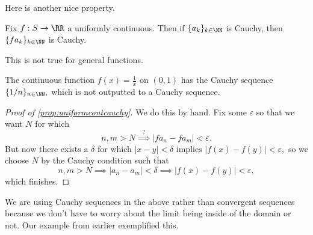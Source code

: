 \documentclass[../notes.tex]{subfiles}
\begin{document}
Here is another nice property.
\begin{proposition} \label{prop:uniformcontcauchy}
	Fix $f:S\to\RR$ a uniformly continuous. Then if $\{a_k\}_{k\in\NN}$ is Cauchy, then $\{fa_k\}_{k\in\NN}$ is Cauchy.
\end{proposition}
This is not true for general functions.
\begin{example}
	The continuous function $f(x)=\frac1x$ on $(0,1)$ has the Cauchy sequence $\{1/n\}_{n\in\NN},$ which is not outputted to a Cauchy sequence.
\end{example}
\begin{proof}[Proof of \autoref{prop:uniformcontcauchy}]
	We do this by hand. Fix some $\varepsilon$ so that we want $N$ for which
	\[n,m>N\stackrel?\implies|fa_n-fa_m|<\varepsilon.\]
	But now there exists a $\delta$ for which $|x-y|<\delta$ implies $|f(x)-f(y)|<\varepsilon,$ so we choose $N$ by the Cauchy condition such that
	\[n,m>N\implies|a_n-a_m|<\delta\implies|f(x)-f(y)|<\varepsilon,\]
	which finishes.
\end{proof}
\begin{remark}
	We are using Cauchy sequences in the above rather than convergent sequences because we don't have to worry about the limit being inside of the domain or not. Our example from earlier exemplified this.
\end{remark}
\end{document}
